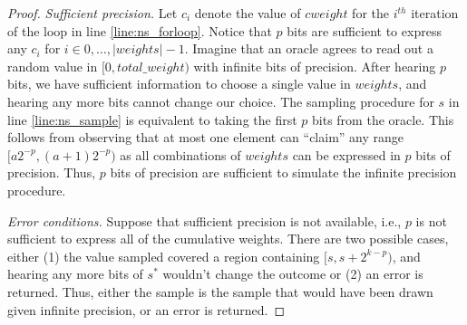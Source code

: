 \documentclass[11pt]{article}
\theoremstyle{definition}
\begin{document}
\begin{proof}


\textit{Sufficient precision.} 
Let $c_i$ denote the value of $cweight$ for the $i^{th}$ iteration of the loop in line \ref{line:ns_forloop}.
Notice that $p$ bits %
are sufficient to express any $c_i$ for $i \in 0,\ldots, |weights|-1$. Imagine that an oracle agrees to read out a random value in $[0,total\_weight)$ with infinite bits of precision. After hearing $p$ bits, we have sufficient information to choose a single value in $weights$, and hearing any more bits cannot change our choice. The sampling procedure for $s$ in line \ref{line:ns_sample} is %
equivalent to taking the first $p$ bits from the oracle. %
This follows from observing that at most one element can ``claim'' any range $[a2^{-p},(a+1)2^{-p})$ as all  combinations of $weights$ can be expressed in $p$ bits of precision. %
Thus, $p$ bits of precision are sufficient to simulate the infinite precision procedure.

\textit{Error conditions.}
Suppose that sufficient precision is not available, i.e., $p$ is not sufficient to express all of the cumulative weights. There are two possible cases, either (1) the value sampled covered a region containing $[s, s + 2^{k-p})$, and hearing any more bits of $s^*$ wouldn't change the outcome or (2) an error is returned. Thus, either the sample is the sample that would have been drawn given infinite precision, or an error is returned. 
\end{proof}
\end{document}
